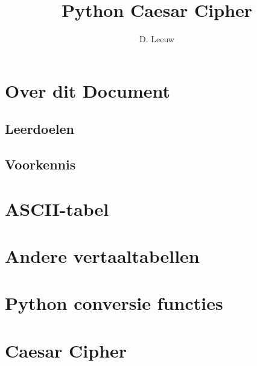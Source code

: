\documentclass[a4paper,12pt,twoside,openright,titlepage]{article}
\author{D. Leeuw}
\title{Python Caesar Cipher}
\date{\today\\
\vfill
\raggedright
\copyright\ 2020-2025 Dennis Leeuw\\
}
\begin{document}

\maketitle


\section{Over dit Document}
\subsection{Leerdoelen}

\subsection{Voorkennis}
%



\section{ASCII-tabel}




\section{Andere vertaaltabellen}


\section{Python conversie functies}


\section{Caesar Cipher}


\printindex
\end{document}
